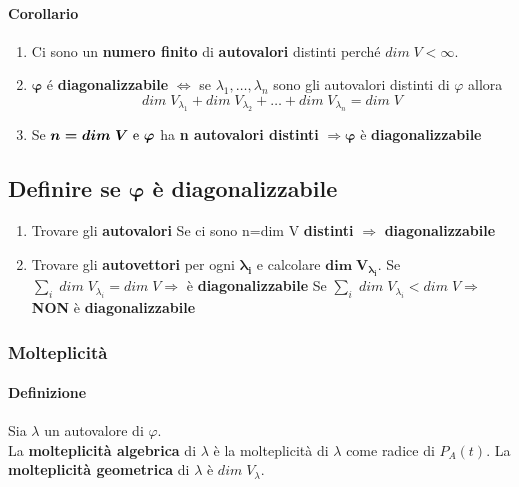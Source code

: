 \documentclass[a4paper, 12pt]{report}
\begin{document}
            \paragraph{Corollario}
            \begin{enumerate}
                \item Ci sono un \textbf{numero finito} di \textbf{autovalori} distinti perché $dim \; V < \infty$.
                \item $\boldsymbol{\varphi}$ é \textbf{diagonalizzabile} $\Leftrightarrow$ se $\lambda_1,\dots,\lambda_n$ sono gli autovalori distinti di $\varphi$ allora
                $$dim \; V_{\lambda_1} + dim \; V_{\lambda_2}+\dots+dim \; V_{\lambda_n}= dim \; V$$
                \item Se $\boldsymbol{n=dim \; V$ e $\varphi}$ ha \textbf{n autovalori distinti} $\Rightarrow \boldsymbol{\varphi}$ è \textbf{diagonalizzabile}
            \end{enumerate}
            \subsection{Definire se $\boldsymbol{\varphi}$ è diagonalizzabile}
            \begin{enumerate}
                \item Trovare gli \textbf{autovalori}
                    \subitem Se ci sono n=dim V \textbf{distinti} $\Rightarrow$ \textbf{diagonalizzabile} 
                \item Trovare gli \textbf{autovettori} per ogni $\boldsymbol{\lambda_i}$ e calcolare $\boldsymbol{dim \; V_{\lambda_i}}$.
                    \subitem Se $\sum_i \; dim \; V_{\lambda_i}= dim \; V \Rightarrow$ è \textbf{diagonalizzabile}
                    \subitem Se $\sum_i \; dim \; V_{\lambda_i}< dim \; V \Rightarrow$ \textbf{NON} è \textbf{diagonalizzabile}
            \end{enumerate}
                    \subsubsection{Molteplicità}
                    \paragraph{Definizione}Sia $\lambda$ un autovalore di $\varphi$.\\
                    La \textbf{molteplicità algebrica} di $\lambda$ è la molteplicità di $\lambda$ come radice di $P_A(t)$.
                    La \textbf{molteplicità geometrica} di $\lambda$ è $dim \; V_\lambda$.
\end{document}
